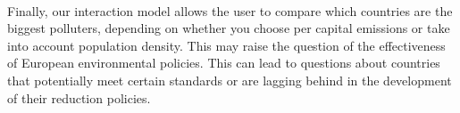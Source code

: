 \documentclass[preprint,journal]{vgtc}       %
\begin{document}
\paragraph{}
Finally, our interaction model allows the user to compare which countries are the biggest polluters, depending on whether you choose per capital emissions or take into account population density. This may raise the question of the effectiveness of European environmental policies. This can lead to questions about countries that potentially meet certain standards or are lagging behind in the development of their reduction policies.


%

%
%
%

\end{document}
